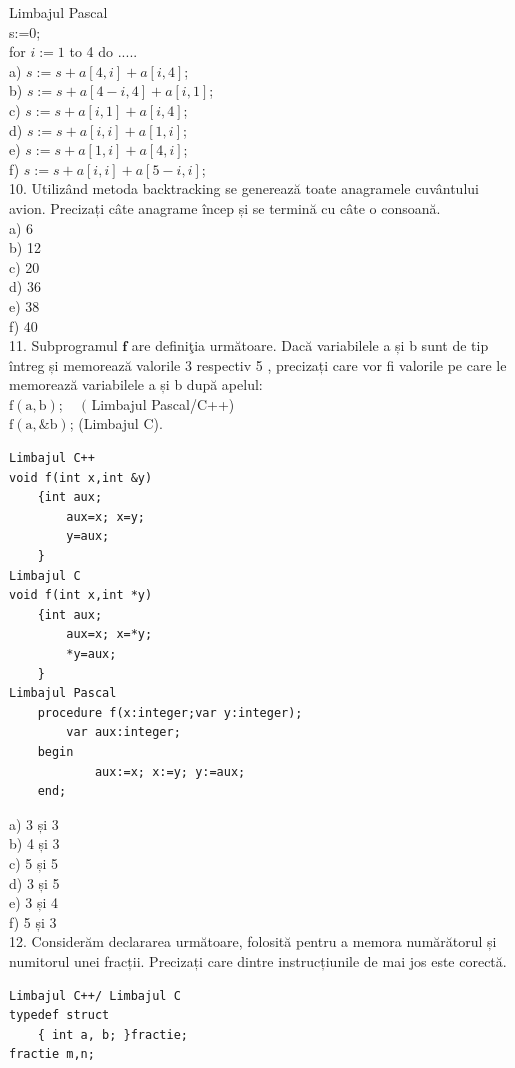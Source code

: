 \documentclass[10pt]{article}
\begin{document}
Limbajul Pascal\\
s:=0;\\
for $i:=1$ to 4 do .....\\
a) $s:=s+a[4, i]+a[i, 4]$;\\
b) $s:=s+a[4-i, 4]+a[i, 1]$;\\
c) $s:=s+a[i, 1]+a[i, 4]$;\\
d) $s:=s+a[i, i]+a[1, i]$;\\
e) $s:=s+a[1, i]+a[4, i]$;\\
f) $s:=s+a[i, i]+a[5-i, i]$;\\
10. Utilizând metoda backtracking se generează toate anagramele cuvântului avion. Precizați câte anagrame încep și se termină cu câte o consoană.\\
a) 6\\
b) 12\\
c) 20\\
d) 36\\
e) 38\\
f) 40\\
11. Subprogramul $\mathbf{f}$ are definiţia următoare. Dacă variabilele a și b sunt de tip întreg și memorează valorile 3 respectiv 5 , precizați care vor fi valorile pe care le memorează variabilele a și b după apelul:\\
$\mathrm{f}(\mathrm{a}, \mathrm{b})$; $\quad($ Limbajul Pascal/C++)\\
$\mathrm{f}(\mathrm{a}, \mathrm{\& b})$; (Limbajul C).

\begin{verbatim}
Limbajul C++
void f(int x,int &y)
    {int aux;
        aux=x; x=y;
        y=aux;
    }
Limbajul C
void f(int x,int *y)
    {int aux;
        aux=x; x=*y;
        *y=aux;
    }
Limbajul Pascal
    procedure f(x:integer;var y:integer);
        var aux:integer;
    begin
            aux:=x; x:=y; y:=aux;
    end;
\end{verbatim}

a) 3 și 3\\
b) 4 și 3\\
c) 5 și 5\\
d) 3 și 5\\
e) 3 și 4\\
f) 5 și 3\\
12. Considerăm declararea următoare, folosită pentru a memora numărătorul și numitorul unei fracții. Precizați care dintre instrucțiunile de mai jos este corectă.

\begin{verbatim}
Limbajul C++/ Limbajul C
typedef struct
    { int a, b; }fractie;
fractie m,n;
\end{verbatim}
\end{document}
